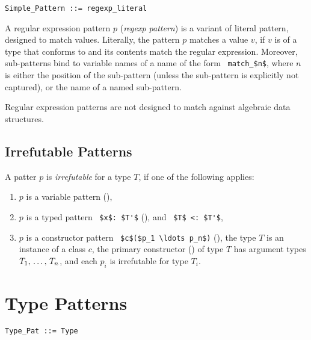 \syntax\begin{lstlisting}
Simple_Pattern ::= regexp_literal
\end{lstlisting}

A regular expression pattern $p$ ({\em regexp pattern}) is a variant of literal pattern, designed to match  values. Literally, the pattern $p $ matches a value $v$, if $v$ is of a type that conforms to  and its contents match the regular expression. Moreover, sub-patterns bind to variable names of a name of the form ~\lstinline!match_$n$!, where $n$ is either the position of the sub-pattern (unless the sub-pattern is explicitly not captured), or the name of a named sub-pattern. 

Regular expression patterns are not designed to match against algebraic data structures. 

\subsection{Irrefutable Patterns}
\label{sec:irrefutable-patterns}

A patter $p$ is {\em irrefutable} for a type $T$, if one of the following applies: 
\begin{enumerate}
\item $p$ is a variable pattern (),
\item $p$ is a typed pattern ~\lstinline!$x$: $T'$! (), and ~\lstinline!$T$ <: $T'$!,
\item $p$ is a constructor pattern ~\lstinline!$c$($p_1 \ldots p_n$)! (), the type $T$ is an instance of a class $c$, the primary constructor () of type $T$ has argument types $T_1 ,\, \ldots ,\, T_n$, and each $p_i$ is irrefutable for type $T_i$. 
\end{enumerate}






\section{Type Patterns}
\label{sec:type-patterns}

\syntax\begin{lstlisting}
Type_Pat ::= Type
\end{lstlisting}

